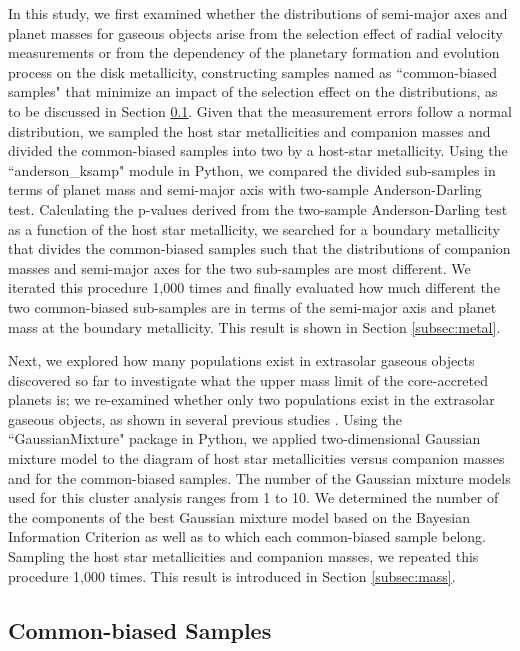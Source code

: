 \documentclass[twocolumn, dvipdfmx]{aastex62}
\begin{document}
\begin{CJK*}{UTF8}{min}
In this study, we first examined whether the distributions of semi-major axes and planet masses for gaseous objects arise from the selection effect of radial velocity measurements or from the dependency of the planetary formation and evolution process on the disk metallicity, constructing samples named as ``common-biased samples" that minimize an impact of the selection effect on the distributions, as to be discussed in Section \ref{subsec:common}. Given that the measurement errors follow a normal distribution, we sampled the host star metallicities and companion masses and divided the common-biased samples into two by a host-star metallicity. Using the ``anderson\_ksamp" module in Python, we compared the divided sub-samples in terms of planet mass and semi-major axis with two-sample Anderson-Darling test. Calculating the p-values derived from the two-sample Anderson-Darling test as a function of the host star metallicity, we searched for a boundary metallicity that divides the common-biased samples such that the distributions of companion masses and semi-major axes for the two sub-samples are most different. We iterated this procedure 1,000 times and finally evaluated how much different the two common-biased sub-samples are in terms of the semi-major axis and planet mass at the boundary metallicity. This result is shown in Section \ref{subsec:metal}.

Next, we explored how many populations exist in extrasolar gaseous objects discovered so far to investigate what the upper mass limit of the core-accreted planets is; we re-examined whether only two populations exist in the extrasolar gaseous objects, as shown in several previous studies \citep{2007A&A...464..779R, 2017A&A...603A..30S, 2018ApJ...853...37S}. Using the ``GaussianMixture" package in Python, we applied two-dimensional Gaussian mixture model to the diagram of host star metallicities versus companion masses and for the common-biased samples. The number of the Gaussian mixture models used for this cluster analysis ranges from 1 to 10. We determined the number of the components of the best Gaussian mixture model based on the Bayesian Information Criterion as well as to which each common-biased sample belong. Sampling the host star metallicities and companion masses, we repeated this procedure 1,000 times. This result is introduced in Section \ref{subsec:mass}.


\subsection{Common-biased Samples} \label{subsec:common}


\end{CJK*}
\end{document}
